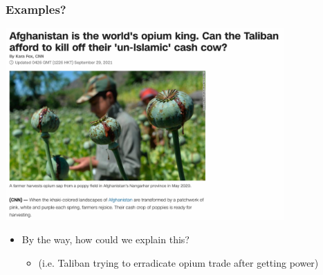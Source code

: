 \documentclass[aspectratio=43]{beamer}
\begin{document}
\begin{frame}
\frametitle{Examples?}
\centering

\includegraphics[width = 0.8\textwidth]{img/taliban_cnn}

\begin{itemize}
  \item By the way, how could we explain this?
  \begin{itemize}
    \item (i.e. Taliban trying to erradicate opium trade after getting power)
  \end{itemize}
\end{itemize}

\end{frame}
\end{document}
